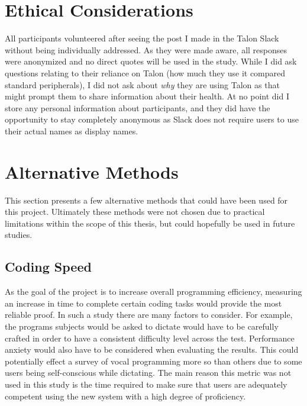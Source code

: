 \documentclass[../thesis.tex]{subfiles}
\begin{document}
\section{Ethical Considerations}%
\label{sec:ethical_considerations}
All participants volunteered after seeing the post I made in the Talon Slack without being individually addressed.
As they were made aware, all responses were anonymized and no direct quotes will be used in the study.
While I did ask questions relating to their reliance on Talon (how much they use it compared standard peripherals), 
I did not ask about \textit{why} they are using Talon as that might prompt them to share information about their health.
At no point did I store any personal information about participants, and they did have the opportunity to stay completely anonymous
as Slack does not require users to use their actual names as display names.



\section{Alternative Methods}\label{alternative_methods}
This section presents a few alternative methods that could have been used for this project.
Ultimately these methods were not chosen due to practical limitations within the scope of this thesis,
but could hopefully be used in future studies.
\subsection{Coding Speed}
As the goal of the project is to increase overall programming efficiency, measuring an increase in time to complete
certain coding tasks would provide the most reliable proof.
In such a study there are many factors to consider.
For example, the programs subjects would be asked to dictate would have to be carefully crafted in order to have a consistent difficulty level across the test.
Performance anxiety would also have to be considered when evaluating the results.
This could potentially effect a survey of vocal programming more so than others due to some users being self-conscious while dictating.
The main reason this metric was not used in this study is the time required to make sure that users
are adequately competent using the new system with a high degree of proficiency.

\end{document}
